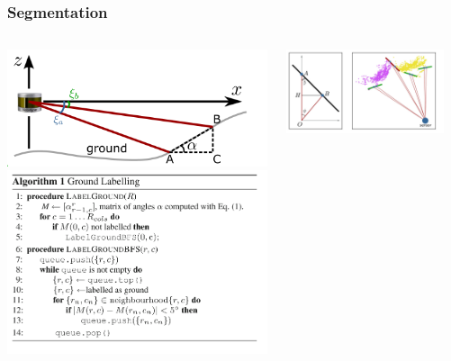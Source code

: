 \documentclass[xcolor=table,usenames,dvipsnames]{beamer}
\begin{document}
\begin{frame}
\frametitle{Segmentation}
\begin{columns}
\begin{column}{0.5\textwidth}
\includegraphics[width=\textwidth]{img/ground_alpha.png}
\includegraphics[width=\textwidth]{img/ground_algo.png}
\end{column}
\begin{column}{0.5\textwidth}
\includegraphics[width=0.9\textwidth]{img/alpha.png}

\end{column}
\end{columns}
\end{frame}
\end{document}
